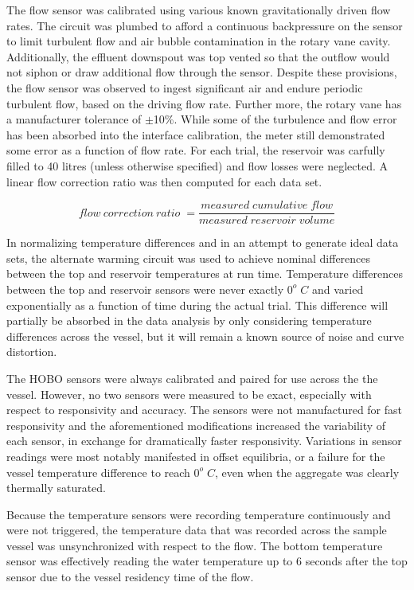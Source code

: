 The flow sensor was calibrated using various known gravitationally driven flow rates. The circuit was plumbed to afford a continuous backpressure on the sensor to limit turbulent flow and air bubble contamination in the rotary vane cavity. Additionally, the effluent downspout was top vented so that the outflow would not siphon or draw additional flow through the sensor. Despite these provisions, the flow sensor was observed to ingest significant air and endure periodic turbulent flow, based on the driving flow rate. Further more, the rotary vane has a manufacturer tolerance of $\pm$10\%. While some of the turbulence and flow error has been absorbed into the interface calibration, the meter still demonstrated some error as a function of flow rate. For each trial, the reservoir was carfully filled to 40 litres (unless otherwise specified) and flow losses were neglected. A linear flow correction ratio was then computed for each data set.

\[flow\:correction\:ratio\;=\frac{measured\;cumulative\;flow}{measured\;reservoir\;volume}\]

In normalizing temperature differences and in an attempt to generate ideal data sets, the alternate warming circuit was used to achieve nominal differences between the top and reservoir temperatures at run time. Temperature differences between the top and reservoir sensors were never exactly $0^o\;C$ and varied exponentially as a function of time during the actual trial. This difference will partially be absorbed in the data analysis by only considering temperature differences across the vessel, but it will remain a known source of noise and curve distortion. 

The HOBO sensors were always calibrated and paired for use across the the vessel. However, no two sensors were measured to be exact, especially with respect to responsivity and accuracy. The sensors were not manufactured for fast responsivity and the aforementioned modifications increased the variability of each sensor, in exchange for dramatically faster responsivity. Variations in sensor readings were most notably manifested in offset equilibria, or a failure for the vessel temperature difference to reach $0^o\;C$, even when the aggregate was clearly thermally saturated. 

Because the temperature sensors were recording temperature continuously and were not triggered, the temperature data that was recorded across the sample vessel was unsynchronized with respect to the flow. The bottom temperature sensor was effectively reading the water temperature up to 6 seconds after the top sensor due to the vessel residency time of the flow. 

